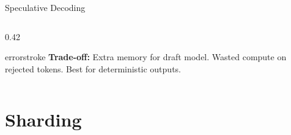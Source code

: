 \documentclass[aspectratio=169, 12pt]{beamer}
\begin{document}
\begin{frame}{Speculative Decoding}
\begin{columns}[T]
\begin{column}{0.42\textwidth}
    \vspace{0.1cm}
    \begin{mlsyscard}{errorstroke}
    {\footnotesize \textbf{Trade-off:} Extra memory for draft model. Wasted compute on rejected tokens. Best for deterministic outputs.}
    \end{mlsyscard}
  \end{column}
\end{columns}

\end{frame}

\section{Sharding}
\end{document}

